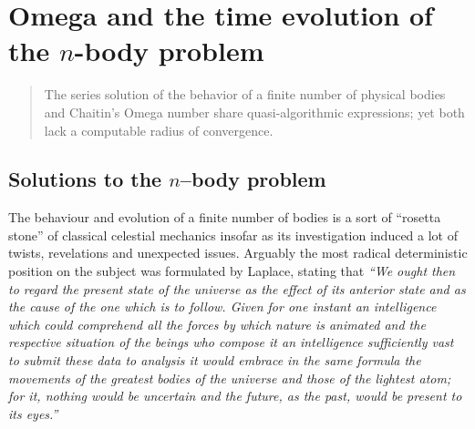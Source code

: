 \documentclass{ws-rv9x6}
\begin{document}
\chapter{Omega and the time evolution of the $n$-body problem\label{chapter-svozil}}

\author[K. Svozil]{Karl Svozil}
\address{Institut f\"ur Theoretische Physik, University of Technology Vienna,\\
Wiedner Hauptstra\ss e 8-10/136, A-1040 Vienna, Austria\\
svozil@tuwien.ac.at}


\begin{abstract}
The series solution of the behavior of a finite number of physical bodies and Chaitin's Omega number
share quasi-algorithmic expressions; yet both lack a computable radius of convergence.
\end{abstract}



\body


\section{Solutions to the $n$--body problem}

The behaviour and evolution of a finite number of bodies is a sort of ``rosetta stone''
of classical celestial mechanics insofar as its investigation induced a lot of
twists, revelations and unexpected issues.
Arguably the most radical deterministic position on the subject
was formulated by Laplace,
stating that \cite[Chapter II]{laplace-prob}
{\em
``We ought then to regard the present state of the
universe as the effect of its anterior state and as the
cause of the one which is to follow. Given for one
instant an intelligence which could comprehend all the
forces by which nature is animated and the respective
situation of the beings who compose it an intelligence
sufficiently vast to submit these data to analysis it
would embrace in the same formula the movements of
the greatest bodies of the universe and those of the
lightest atom; for it, nothing would be uncertain and
the future, as the past, would be present to its eyes.''
}
\end{document}
